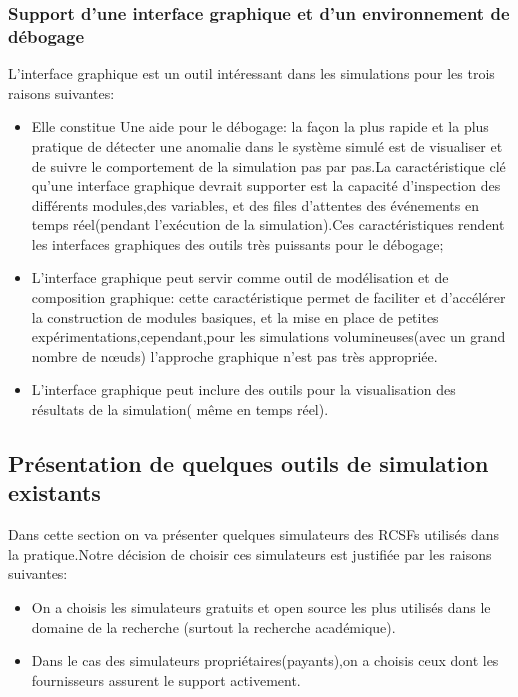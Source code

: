 \subsubsection{Support d'une interface graphique et d'un environnement de débogage}
L'interface graphique est un outil intéressant dans les simulations pour les trois raisons suivantes:
\begin{itemize}
\item Elle constitue Une aide pour le débogage:  la façon la plus rapide et la plus pratique de détecter une anomalie dans le système simulé est de visualiser et de suivre le comportement de la simulation pas par pas.La caractéristique clé qu'une interface graphique devrait supporter est la capacité d'inspection des différents modules,des variables, et des files d'attentes des événements en temps réel(pendant l'exécution de la simulation).Ces caractéristiques rendent les interfaces graphiques des outils très puissants pour le débogage;
\item L'interface graphique peut servir comme outil de modélisation et de composition graphique:
cette caractéristique permet de faciliter et d'accélérer la construction de modules basiques, et la mise en place de petites expérimentations,cependant,pour les simulations volumineuses(avec un grand nombre de nœuds) l'approche graphique n'est pas très appropriée.
\item L'interface graphique peut inclure des outils pour la visualisation des résultats de la simulation( même en temps réel).
\end{itemize}

\subsection{Présentation de quelques outils de simulation existants}
Dans cette section on va présenter quelques simulateurs des RCSFs utilisés dans la pratique.Notre décision de choisir ces simulateurs est justifiée par les raisons suivantes:
\begin{itemize}

\item On a choisis les simulateurs gratuits et open source les plus utilisés dans le domaine de la recherche (surtout la recherche académique).
\item Dans le cas des simulateurs propriétaires(payants),on a choisis ceux dont les fournisseurs assurent le support activement.

\end{itemize}

